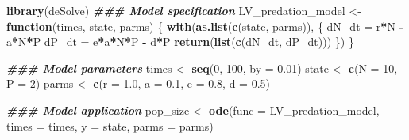 \documentclass[
]{book}
\newenvironment{Shaded}{\begin{snugshade}}{\end{snugshade}}
\newcommand{\AttributeTok}[1]{\textcolor[rgb]{0.13,0.29,0.53}{#1}}
\newcommand{\ControlFlowTok}[1]{\textcolor[rgb]{0.13,0.29,0.53}{\textbf{#1}}}
\newcommand{\DecValTok}[1]{\textcolor[rgb]{0.00,0.00,0.81}{#1}}
\newcommand{\DocumentationTok}[1]{\textcolor[rgb]{0.56,0.35,0.01}{\textbf{\textit{#1}}}}
\newcommand{\FloatTok}[1]{\textcolor[rgb]{0.00,0.00,0.81}{#1}}
\newcommand{\FunctionTok}[1]{\textcolor[rgb]{0.13,0.29,0.53}{\textbf{#1}}}
\newcommand{\NormalTok}[1]{#1}
\newcommand{\OtherTok}[1]{\textcolor[rgb]{0.56,0.35,0.01}{#1}}
\newcommand{\SpecialCharTok}[1]{\textcolor[rgb]{0.81,0.36,0.00}{\textbf{#1}}}
\begin{document}
\begin{Shaded}
\begin{Highlighting}[]
\FunctionTok{library}\NormalTok{(deSolve)}
\DocumentationTok{\#\#\# Model specification}
\NormalTok{LV\_predation\_model }\OtherTok{\textless{}{-}} \ControlFlowTok{function}\NormalTok{(times, state, parms) \{}
  \FunctionTok{with}\NormalTok{(}\FunctionTok{as.list}\NormalTok{(}\FunctionTok{c}\NormalTok{(state, parms)), \{}
\NormalTok{    dN\_dt }\OtherTok{=}\NormalTok{ r}\SpecialCharTok{*}\NormalTok{N }\SpecialCharTok{{-}}\NormalTok{ a}\SpecialCharTok{*}\NormalTok{N}\SpecialCharTok{*}\NormalTok{P}
\NormalTok{    dP\_dt }\OtherTok{=}\NormalTok{ e}\SpecialCharTok{*}\NormalTok{a}\SpecialCharTok{*}\NormalTok{N}\SpecialCharTok{*}\NormalTok{P }\SpecialCharTok{{-}}\NormalTok{ d}\SpecialCharTok{*}\NormalTok{P}
    \FunctionTok{return}\NormalTok{(}\FunctionTok{list}\NormalTok{(}\FunctionTok{c}\NormalTok{(dN\_dt, dP\_dt)))}
\NormalTok{  \})}
\NormalTok{\}}

\DocumentationTok{\#\#\# Model parameters}
\NormalTok{times }\OtherTok{\textless{}{-}} \FunctionTok{seq}\NormalTok{(}\DecValTok{0}\NormalTok{, }\DecValTok{100}\NormalTok{, }\AttributeTok{by =} \FloatTok{0.01}\NormalTok{)}
\NormalTok{state }\OtherTok{\textless{}{-}} \FunctionTok{c}\NormalTok{(}\AttributeTok{N =} \DecValTok{10}\NormalTok{, }\AttributeTok{P =} \DecValTok{2}\NormalTok{)}
\NormalTok{parms }\OtherTok{\textless{}{-}} \FunctionTok{c}\NormalTok{(}\AttributeTok{r =} \FloatTok{1.0}\NormalTok{, }\AttributeTok{a =} \FloatTok{0.1}\NormalTok{, }\AttributeTok{e =} \FloatTok{0.8}\NormalTok{, }\AttributeTok{d =} \FloatTok{0.5}\NormalTok{)}

\DocumentationTok{\#\#\# Model application}
\NormalTok{pop\_size }\OtherTok{\textless{}{-}} \FunctionTok{ode}\NormalTok{(}\AttributeTok{func =}\NormalTok{ LV\_predation\_model, }\AttributeTok{times =}\NormalTok{ times, }\AttributeTok{y =}\NormalTok{ state, }\AttributeTok{parms =}\NormalTok{ parms)}


\end{Highlighting}
\end{Shaded}
\end{document}
